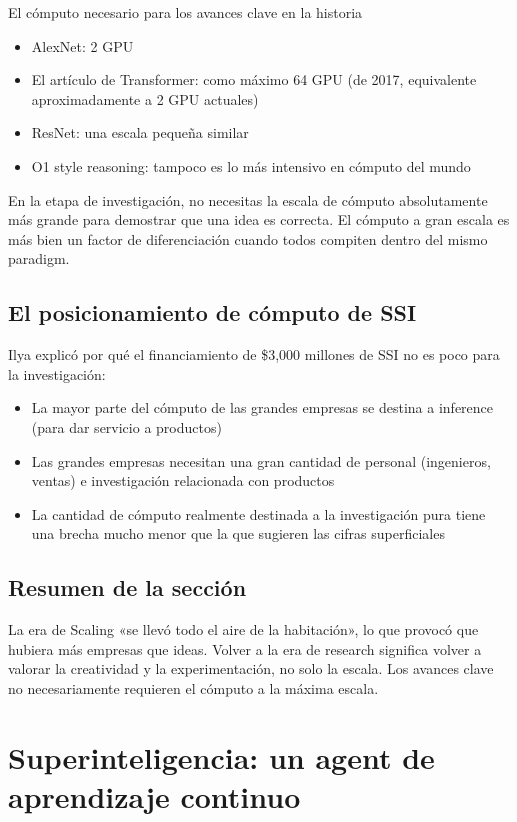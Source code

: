 \documentclass[a4paper]{article}
\begin{document}
\begin{knowledgebox}{El cómputo necesario para los avances clave en la historia}
\begin{itemize}
    \item AlexNet: 2 GPU
    \item El artículo de Transformer: como máximo 64 GPU (de 2017, equivalente aproximadamente a 2 GPU actuales)
    \item ResNet: una escala pequeña similar
    \item O1 style reasoning: tampoco es lo más intensivo en cómputo del mundo
\end{itemize}
En la etapa de investigación, no necesitas la escala de cómputo absolutamente más grande para demostrar que una idea es correcta. El cómputo a gran escala es más bien un factor de diferenciación cuando todos compiten dentro del mismo paradigm.
\end{knowledgebox}

\subsection{El posicionamiento de cómputo de SSI}

Ilya explicó por qué el financiamiento de \$3,000 millones de SSI no es poco para la investigación:
\begin{itemize}
    \item La mayor parte del cómputo de las grandes empresas se destina a inference (para dar servicio a productos)
    \item Las grandes empresas necesitan una gran cantidad de personal (ingenieros, ventas) e investigación relacionada con productos
    \item La cantidad de cómputo realmente destinada a la investigación pura tiene una brecha mucho menor que la que sugieren las cifras superficiales
\end{itemize}

\subsection{Resumen de la sección}

La era de Scaling «se llevó todo el aire de la habitación», lo que provocó que hubiera más empresas que ideas. Volver a la era de research significa volver a valorar la creatividad y la experimentación, no solo la escala. Los avances clave no necesariamente requieren el cómputo a la máxima escala.


\section{Superinteligencia: un agent de aprendizaje continuo}
\end{document}

